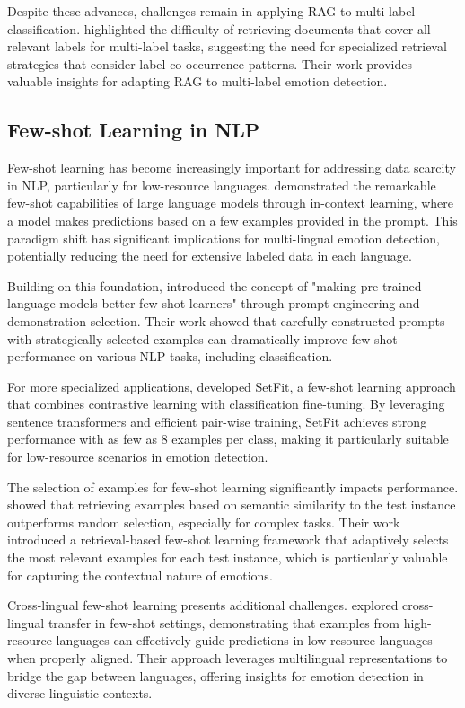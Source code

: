 \documentclass[a4paper,12pt]{extarticle}
\begin{document}
Despite these advances, challenges remain in applying RAG to multi-label classification. \cite{glass2022re} highlighted the difficulty of retrieving documents that cover all relevant labels for multi-label tasks, suggesting the need for specialized retrieval strategies that consider label co-occurrence patterns. Their work provides valuable insights for adapting RAG to multi-label emotion detection.

\subsection{Few-shot Learning in NLP}

Few-shot learning has become increasingly important for addressing data scarcity in NLP, particularly for low-resource languages. \cite{brown2020language} demonstrated the remarkable few-shot capabilities of large language models through in-context learning, where a model makes predictions based on a few examples provided in the prompt. This paradigm shift has significant implications for multi-lingual emotion detection, potentially reducing the need for extensive labeled data in each language.

Building on this foundation, \cite{gao2021making} introduced the concept of "making pre-trained language models better few-shot learners" through prompt engineering and demonstration selection. Their work showed that carefully constructed prompts with strategically selected examples can dramatically improve few-shot performance on various NLP tasks, including classification.

For more specialized applications, \cite{tunstall2022efficient} developed SetFit, a few-shot learning approach that combines contrastive learning with classification fine-tuning. By leveraging sentence transformers and efficient pair-wise training, SetFit achieves strong performance with as few as 8 examples per class, making it particularly suitable for low-resource scenarios in emotion detection.

The selection of examples for few-shot learning significantly impacts performance. \cite{liu2022few} showed that retrieving examples based on semantic similarity to the test instance outperforms random selection, especially for complex tasks. Their work introduced a retrieval-based few-shot learning framework that adaptively selects the most relevant examples for each test instance, which is particularly valuable for capturing the contextual nature of emotions.

Cross-lingual few-shot learning presents additional challenges. \cite{zhao2021multi} explored cross-lingual transfer in few-shot settings, demonstrating that examples from high-resource languages can effectively guide predictions in low-resource languages when properly aligned. Their approach leverages multilingual representations to bridge the gap between languages, offering insights for emotion detection in diverse linguistic contexts.
\end{document}
